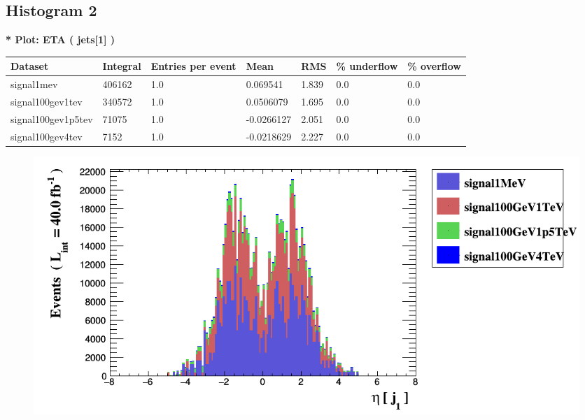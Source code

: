 \documentclass[a4paper, 10pt]{article}
\begin{document}
\subsection{ Histogram 2}

\textbf{* Plot: ETA ( jets[1] ) }\\
   \begin{table}[H]
  \begin{center}
    \begin{tabular}{|m{23.0mm}|m{23.0mm}|m{18.0mm}|m{19.0mm}|m{19.0mm}|m{19.0mm}|m{19.0mm}|}
      \hline
      {\cellcolor{yellow}         Dataset}& {\cellcolor{yellow}         Integral}& {\cellcolor{yellow}         Entries per event}& {\cellcolor{yellow}         Mean}& {\cellcolor{yellow}         RMS}& {\cellcolor{yellow}         \% underflow}& {\cellcolor{yellow}         \% overflow}\\
      \hline
      {\cellcolor{white}         signal1mev}& {\cellcolor{white}         406162}& {\cellcolor{white}         1.0}& {\cellcolor{white}         0.069541}& {\cellcolor{white}         1.839}& {\cellcolor{green}         0.0}& {\cellcolor{green}         0.0}\\
      \hline
      {\cellcolor{white}         signal100gev1tev}& {\cellcolor{white}         340572}& {\cellcolor{white}         1.0}& {\cellcolor{white}         0.0506079}& {\cellcolor{white}         1.695}& {\cellcolor{green}         0.0}& {\cellcolor{green}         0.0}\\
      \hline
      {\cellcolor{white}         signal100gev1p5tev}& {\cellcolor{white}         71075}& {\cellcolor{white}         1.0}& {\cellcolor{white}         -0.0266127}& {\cellcolor{white}         2.051}& {\cellcolor{green}         0.0}& {\cellcolor{green}         0.0}\\
      \hline
      {\cellcolor{white}         signal100gev4tev}& {\cellcolor{white}         7152}& {\cellcolor{white}         1.0}& {\cellcolor{white}         -0.0218629}& {\cellcolor{white}         2.227}& {\cellcolor{green}         0.0}& {\cellcolor{green}         0.0}\\
\hline
    \end{tabular}
  \end{center}
\end{table}

\begin{figure}[H]
  \begin{center}
    \includegraphics[scale=0.45]{selection_1.png}\\
\caption{   }
  \end{center}
\end{figure}
      \newpage
\end{document}
